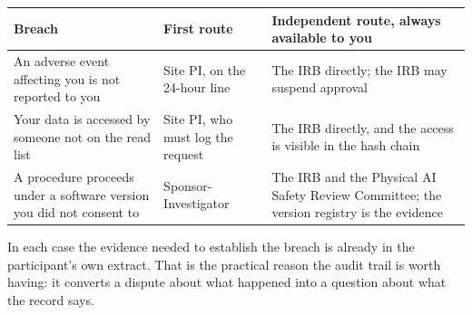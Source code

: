 \noindent\begin{tabularx}{\textwidth}{L{4.5cm} L{4.0cm} Y}
\toprule
\textbf{Breach} & \textbf{First route} & \textbf{Independent route, always available to you} \\
\midrule
An adverse event affecting you is not reported to you & Site PI, on the 24-hour line & The IRB directly; the IRB may suspend approval \\
Your data is accessed by someone not on the read list & Site PI, who must log the request & The IRB directly, and the access is visible in the hash chain \\
A procedure proceeds under a software version you did not consent to & Sponsor-Investigator & The IRB and the Physical AI Safety Review Committee; the version registry is the evidence \\
\bottomrule
\end{tabularx}

\vspace{0.30em}

\noindent In each case the evidence needed to establish the breach is already in
the participant's own extract. That is the practical reason the audit trail is
worth having: it converts a dispute about what happened into a question about
what the record says.
